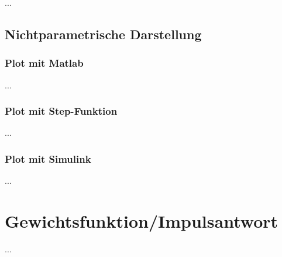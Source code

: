 \documentclass[
  ngerman
  ,12pt
  ,pdftex
]{article}
\begin{document}


...
\subsection{Nichtparametrische Darstellung}
\subsubsection{Plot mit Matlab}
        
%
                    
...
\subsubsection{Plot mit Step-Funktion}
...
\subsubsection{Plot mit Simulink}
...

\section{Gewichtsfunktion/Impulsantwort} %
...
\end{document}
